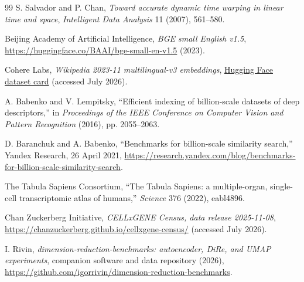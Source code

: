 \documentclass[10pt]{article}
\begin{document}
\begin{thebibliography}{99}
S. Salvador and P. Chan,
\emph{Toward accurate dynamic time warping in linear time and space},
\emph{Intelligent Data Analysis} 11 (2007), 561--580.

Beijing Academy of Artificial Intelligence,
\emph{BGE small English v1.5},
\url{https://huggingface.co/BAAI/bge-small-en-v1.5} (2023).

Cohere Labs,
\emph{Wikipedia 2023-11 multilingual-v3 embeddings},
\href{https://huggingface.co/datasets/CohereLabs/wikipedia-2023-11-embed-multilingual-v3}
{Hugging Face dataset card} (accessed July 2026).

A. Babenko and V. Lempitsky,
``Efficient indexing of billion-scale datasets of deep descriptors,''
in \emph{Proceedings of the IEEE Conference on Computer Vision and Pattern Recognition}
(2016), pp. 2055--2063.

D. Baranchuk and A. Babenko,
``Benchmarks for billion-scale similarity search,''
Yandex Research, 26 April 2021,
\url{https://research.yandex.com/blog/benchmarks-for-billion-scale-similarity-search}.

The Tabula Sapiens Consortium,
``The Tabula Sapiens: a multiple-organ, single-cell transcriptomic atlas of humans,''
\emph{Science} 376 (2022), eabl4896.

Chan Zuckerberg Initiative,
\emph{CELLxGENE Census, data release 2025-11-08},
\url{https://chanzuckerberg.github.io/cellxgene-census/}
(accessed July 2026).

I. Rivin,
\emph{dimension-reduction-benchmarks: autoencoder, DiRe, and UMAP experiments},
companion software and data repository (2026),
\url{https://github.com/igorrivin/dimension-reduction-benchmarks}.
\end{thebibliography}
\end{document}

